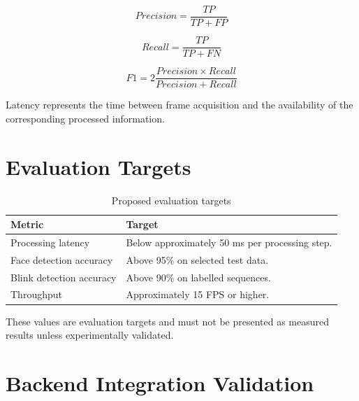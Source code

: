 \documentclass{tietreport}
\begin{document}
\begin{equation}
Precision =
\frac{TP}{TP+FP}
\end{equation}

\begin{equation}
Recall =
\frac{TP}{TP+FN}
\end{equation}

\begin{equation}
F1 =
2
\frac{
Precision \times Recall
}{
Precision + Recall
}
\end{equation}

Latency represents the time between frame acquisition and the
availability of the corresponding processed information.


\section{Evaluation Targets}

\begin{table}[H]
\centering
\caption{Proposed evaluation targets}
\label{tab:targets}

\begin{tabularx}{0.80\textwidth}{@{}P{5cm}Y@{}}

\toprule
\textbf{Metric} & \textbf{Target}\\
\midrule

Processing latency &
Below approximately 50 ms per processing step.\\

Face detection accuracy &
Above 95\% on selected test data.\\

Blink detection accuracy &
Above 90\% on labelled sequences.\\

Throughput &
Approximately 15 FPS or higher.\\

\bottomrule

\end{tabularx}
\end{table}

These values are evaluation targets and must not be presented as
measured results unless experimentally validated.


\section{Backend Integration Validation}
\end{document}
